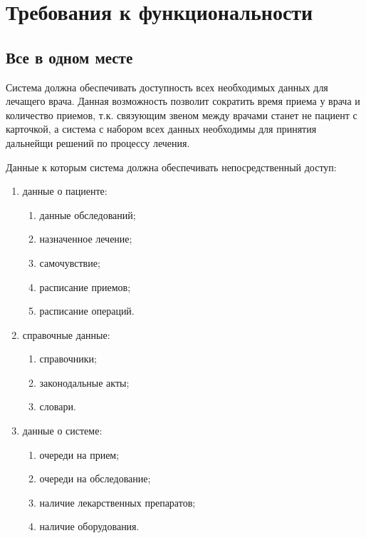 \section{Требования к функциональности}
\subsection{Все в одном месте}
Система должна обеспечивать доступность всех необходимых данных для лечащего врача. Данная возможность позволит сократить время приема у врача и количество приемов, т.к. связующим звеном между врачами станет не пациент с карточкой, а система с набором всех данных необходимы для принятия дальнейщи решений по процессу лечения.

Данные к которым система должна обеспечивать непосредственный доступ:

\begin{enumerate}
  \item данные о пациенте:
  \begin{enumerate}
    \item данные обследований;
    \item назначенное лечение;
    \item самочувствие;
    \item расписание приемов;
    \item расписание операций.
  \end{enumerate}
  \item справочные данные:
  \begin{enumerate}
    \item справочники;
    \item законодальные акты;
    \item словари.
  \end{enumerate}
  \item данные о системе:
  \begin{enumerate}
    \item очереди на прием;
    \item очереди на обследование;
    \item наличие лекарственных препаратов;
    \item наличие оборудования.
  \end{enumerate}     
\end{enumerate}




